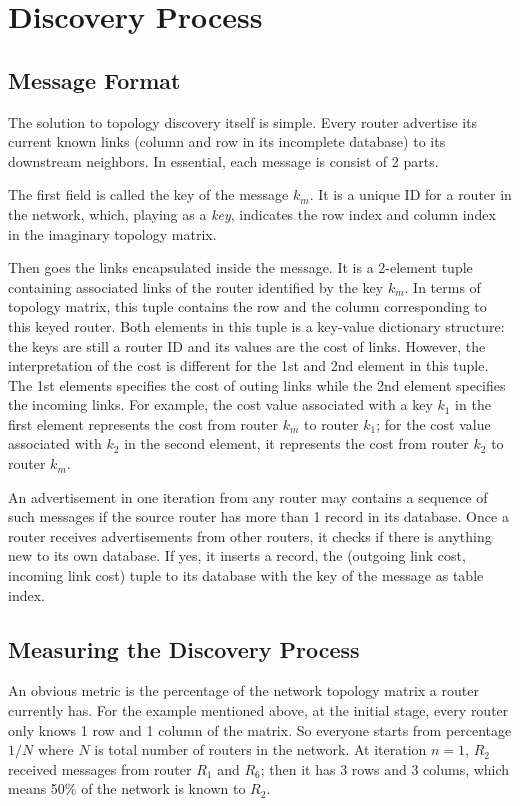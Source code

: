 \documentclass[12pt]{article}  %
\theoremstyle{definition}
\theoremstyle{remark}
\begin{document}
\section{Discovery Process}

\subsection{Message Format}
The solution to topology discovery itself is simple.
Every router advertise its current known links (column and row in its incomplete database) to its downstream neighbors.
In essential, each message is consist of 2 parts.

The first field is called the key of the message $k_m$.
It is a unique ID for a router in the network, which, playing as a \textit{key}, indicates the row index and column index in the imaginary topology matrix.

Then goes the links encapsulated inside the message.
It is a 2-element tuple containing associated links of the router identified by the key $k_m$.
In terms of topology matrix, this tuple contains the row and the column corresponding to this keyed router.
Both elements in this tuple is a key-value dictionary structure: the keys are still a router ID and its values are the cost of links.
However, the interpretation of the cost is different for the 1st and 2nd element in this tuple.
The 1st elements specifies the cost of outing links while the 2nd element specifies the incoming links.
For example, the cost value associated with a key $k_1$ in the first element represents the cost from router $k_m$ to router $k_1$;
for the cost value associated with $k_2$ in the second element, it represents the cost from router $k_2$ to router $k_m$.

An advertisement in one iteration from any router may contains a sequence of such messages if the source router has more than 1 record in its database.
Once a router receives advertisements from other routers, it checks if there is anything new to its own database.
If yes, it inserts a record, the (outgoing link cost, incoming link cost) tuple to its database with the key of the message as table index.

\subsection{Measuring the Discovery Process}
An obvious metric is the percentage of the network topology matrix a router currently has.
For the example mentioned above, at the initial stage, every router only knows 1 row and 1 column of the matrix.
So everyone starts from percentage $1/N$ where $N$ is total number of routers in the network.
At iteration $n=1$, $R_2$ received messages from router $R_1$ and $R_6$; then it has 3 rows and 3 colums, which means 50\% of the network is known to $R_2$.
\end{document}

